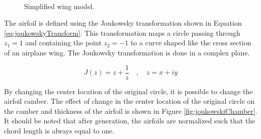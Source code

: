 \documentclass[12pt]{aiaa-pretty}
\begin{document}
%
\begin{figure}[H]
	\centering
	\\
	\caption{Simplified wing model.}
	\label{fig:wingModel}
\end{figure}
%

The airfoil is defined using the Joukowsky transformation shown in Equation \eqref{eq:joukowskyTransform}. This transformation maps a circle passing through $z_1 = 1$ and containing the point $z_2 = -1$ to a curve shaped like the cross section of an airplane wing. The Joukowsky transformation is done in a complex plane.

%
\begin{equation}\label{eq:joukowskyTransform}
J(z) = z + \frac{1}{z} \quad , \quad z = x + iy
\end{equation}
%

By changing the center location of the original circle, it is possible to change the airfoil camber. The effect of change in the center location of the original circle on the camber and thickness of the airfoil is shown in Figure \ref{fig:joukowskiChamber}. It should be noted that after generation, the airfoils are normalized such that the chord length is always equal to one.\\
\end{document}
